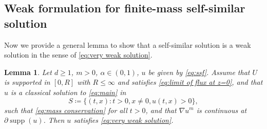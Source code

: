 \documentclass[a4paper]{article}
\newtheorem{lemma}[theorem]{Lemma}
\theoremstyle{definition}
\begin{document}
\subsection{Weak formulation for finite-mass self-similar solution}
Now we provide a general lemma to show that a self-similar solution is a weak solution in the sense of \eqref{eq:very weak solution}.
\begin{lemma}
  \label{lem:sss is weak solution}
  Let $d \ge 1$, $m > 0$, $\alpha \in (0,1)$, $u$ be given by \eqref{eq:ssf}.
  Assume that $U$ is supported in $[0,R]$ with $R \le \infty$ and satisfies \eqref{eq:limit of flux at z=0}, and that $u$ is a classical solution to \eqref{eq:main} in
  \begin{equation*}
    S \coloneqq \{(t,x) : t > 0, x \ne 0, u(t,x) > 0\},
  \end{equation*}
  such that \eqref{eq:mass conservation} for all $t > 0$, and that $\nabla u^{m}$ is continuous at $\partial \operatorname{supp}(u)$.
  Then $u$ satisfies \eqref{eq:very weak solution}.
\end{lemma}
\end{document}
